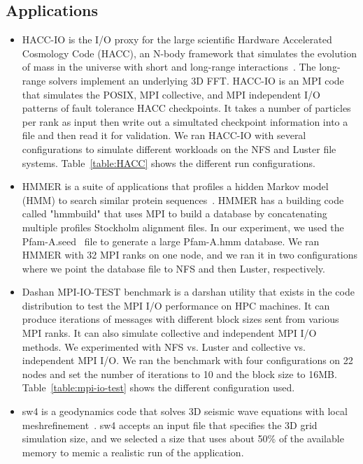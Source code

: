\subsection{Applications}
\begin{itemize}
	\item HACC-IO is the I/O proxy for the large scientific Hardware Accelerated Cosmology Code (HACC), an N-body framework that simulates the evolution of mass in the universe with short and long-range interactions~\cite{habib2013hacc}. The long-range solvers implement an underlying 3D FFT. HACC-IO is an MPI code that simulates the POSIX, MPI collective, and MPI independent I/O patterns of fault tolerance HACC checkpoints. It takes a number of particles per rank as input then write out a simultated checkpoint information into a file and then read it for validation. We ran HACC-IO with several configurations to simulate different workloads on the NFS and Luster file systems. Table~\ref{table:HACC} shows the different run configurations. 
	\item HMMER is a suite of applications that profiles a hidden Markov model (HMM) to search similar protein sequences~\cite{eddy1992hmmer}. HMMER has a building code called "hmmbuild" that uses MPI to build a database by concatenating multiple profiles Stockholm alignment files. In our experiment, we used the Pfam-A.seed~\cite{sonnhammer1998pfam} file to generate a large Pfam-A.hmm database. We ran HMMER with 32 MPI ranks on one node, and we ran it in two configurations where we point the database file to NFS and then Luster, respectively. 
	\item Dashan MPI-IO-TEST benchmark is a darshan utility that exists in the code distribution to test the MPI I/O performance on HPC machines. It can produce iterations of messages with different block sizes sent from various MPI ranks. It can also simulate collective and independent MPI I/O methods. We experimented with NFS vs. Luster and collective vs. independent MPI I/O. We ran the benchmark with four configurations on 22 nodes and set the number of iterations to 10 and the block size to 16MB. Table~\ref{table:mpi-io-test} shows the different configuration used.
	\item sw4 is a geodynamics code that solves 3D seismic wave equations with local meshrefinement~\cite{peterssonsw4}. sw4 accepts an input file that specifies the 3D grid simulation size, and we selected a size that uses about 50\% of the available memory to memic a realistic run of the application.
\end{itemize}

